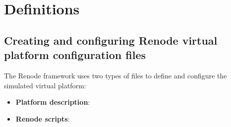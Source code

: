 \chapter{Definitions}

\section{Creating and configuring Renode virtual platform configuration files} \label{app:creating_renode_platforms}

The Renode framework uses two types of files to define and configure the simulated virtual platform:

\begin{itemize}
	\item \textbf{Platform description}:
	\item \textbf{Renode scripts}:
\end{itemize}
